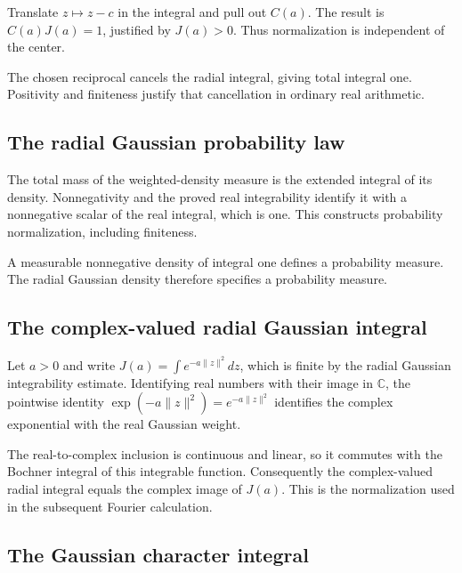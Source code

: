 \documentclass[11pt,a4paper]{article}
\begin{document}
Translate \(z\mapsto z-c\) in the integral and pull out \(C(a)\). The result is \(C(a)J(a)=1\), justified by \(J(a)>0\). Thus normalization is independent of the center.



The chosen reciprocal cancels the radial integral, giving total integral one. Positivity and finiteness justify that cancellation in ordinary real arithmetic.


\subsection{\texorpdfstring{The radial Gaussian probability law}{The radial Gaussian probability law}}


The total mass of the weighted-density measure is the extended integral of its density. Nonnegativity and the proved real integrability identify it with a nonnegative scalar of the real integral, which is one. This constructs probability normalization, including finiteness.



A measurable nonnegative density of integral one defines a probability measure. The radial Gaussian density therefore specifies a probability measure.


\subsection{\texorpdfstring{The complex-valued radial Gaussian integral}{The complex-valued radial Gaussian integral}}


Let \(a>0\) and write \(J(a)=\int e^{-a\|z\|^2}dz\), which is finite by the radial Gaussian integrability estimate. Identifying real numbers with their image in \(\mathbb C\), the pointwise identity \(\exp(-a\|z\|^2)=e^{-a\|z\|^2}\) identifies the complex exponential with the real Gaussian weight.



The real-to-complex inclusion is continuous and linear, so it commutes with the Bochner integral of this integrable function. Consequently the complex-valued radial integral equals the complex image of \(J(a)\). This is the normalization used in the subsequent Fourier calculation.


\subsection{\texorpdfstring{The Gaussian character integral}{The Gaussian character integral}}
\end{document}
